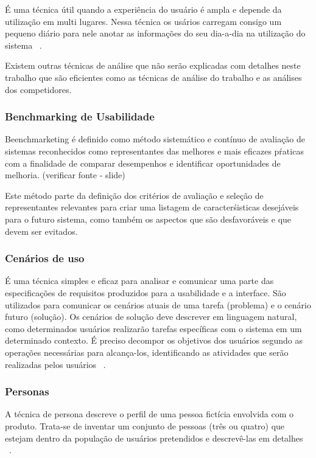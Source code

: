 	É uma técnica útil quando a experiência do usuário é ampla e depende da utilização em multi lugares. Nessa técnica os usários carregam consigo um pequeno diário para nele anotar as informações do seu dia-a-dia na utilização do sistema ~\cite{cybis2010}.

	Existem outras técnicas de análise que não serão explicadas com detalhes neste trabalho que são eficientes como as técnicas de análise do trabalho e as análises dos competidores.

\subsubsection{Benchmarking de Usabilidade}

	Beenchmarketing é definido como método sistemático e contínuo de avaliação de sistemas reconhecidos como representantes das melhores e mais eficazes pŕaticas com a finalidade de comparar desempenhos e identificar oportunidades de melhoria. (verificar fonte - slide)

	Este método parte da definição dos critérios de avaliação e seleção de representantes relevantes para criar uma listagem de caracterśisticas desejáveis para o futuro sistema, como também os aspectos que são desfavoráveis e que devem ser evitados.

\subsubsection{Cenários de uso}

	É uma técnica simples e eficaz para analisar e comunicar uma parte das especificações de requisitos produzidos para a usabilidade e a interface. São utilizados para comunicar os cenários atuais de uma tarefa (problema) e o cenário futuro (solução). Os cenários de solução deve descrever em linguagem natural, como determinados usuários realizarão tarefas específicas com o sistema em um determinado contexto. É preciso decompor os objetivos dos usuários segundo as operações necessárias para alcança-los, identificando as atividades que serão realizadas pelos usuários ~\cite{cybis2010}.

\subsubsection{Personas}

	A técnica de persona descreve o perfil de uma pessoa fictícia envolvida com o produto. Trata-se de inventar um conjunto de pessoas (três ou quatro) que estejam dentro da população de usuários pretendidos e descrevê-las em detalhes ~\cite{cybis2010}.

